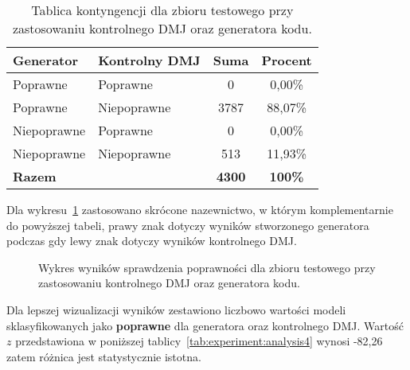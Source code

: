 \begin{table}[H]
\caption{Tablica kontyngencji dla zbioru testowego przy zastosowaniu kontrolnego DMJ oraz generatora kodu.}\label{tab:tabela11}
\centering%
\begin{tabular}{|l|l|c|c|}
\hline
\textbf{Generator} & \textbf{Kontrolny DMJ} & \textbf{Suma} & \textbf{Procent} \\
\hline
Poprawne & Poprawne & 0 & 0,00\% \\
\hline
Poprawne & Niepoprawne & 3787 & 88,07\% \\
\hline
Niepoprawne & Poprawne & 0 & 0,00\% \\
\hline
Niepoprawne & Niepoprawne & 513 & 11,93\% \\
\hline
\textbf{Razem} & & \textbf{4300} & \textbf{100\%} \\
\hline
\end{tabular}
\end{table}

Dla wykresu~\ref{rys:plama2k} zastosowano skrócone nazewnictwo, w którym komplementarnie do powyższej tabeli, prawy znak dotyczy wyników stworzonego generatora podczas gdy lewy znak dotyczy wyników kontrolnego DMJ.

\begin{figure}[H]
\centering
{}
\caption{Wykres wyników sprawdzenia poprawności dla zbioru testowego przy zastosowaniu kontrolnego DMJ oraz generatora kodu.}\label{rys:plama2k}
\end{figure}

Dla lepszej wizualizacji wyników zestawiono liczbowo wartości modeli sklasyfikowanych jako \textbf{poprawne} dla generatora  oraz kontrolnego DMJ. Wartość \( z \) przedstawiona w poniższej tablicy~\ref{tab:experiment:analysis4} wynosi -82,26 zatem różnica jest statystycznie istotna.


